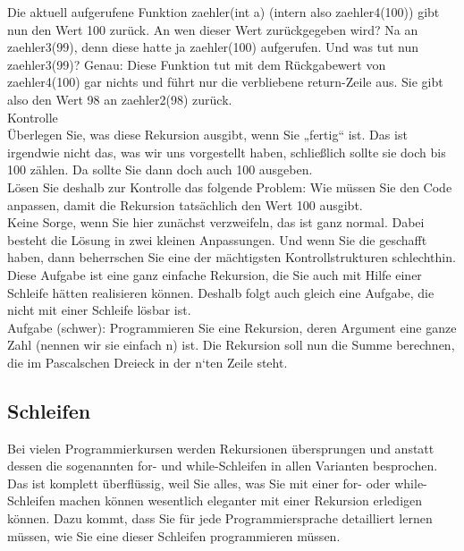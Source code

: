 Die aktuell aufgerufene Funktion zaehler(int a) (intern also zaehler4(100)) gibt nun den Wert 100 zurück. An wen dieser Wert zurückgegeben wird? Na an zaehler3(99), denn diese hatte ja zaehler(100) aufgerufen. Und was tut nun zaehler3(99)? Genau: Diese Funktion tut mit dem Rückgabewert von zaehler4(100) gar nichts und führt nur die verbliebene return-Zeile aus. Sie gibt also den Wert 98 an zaehler2(98) zurück.\\

Kontrolle\\

Überlegen Sie, was diese Rekursion ausgibt, wenn Sie „fertig“ ist. Das ist irgendwie nicht das, was wir uns vorgestellt haben, schließlich sollte sie doch bis 100 zählen. Da sollte Sie dann doch auch 100 ausgeben. \\

Lösen Sie deshalb zur Kontrolle das folgende Problem: Wie müssen Sie den Code anpassen, damit die Rekursion tatsächlich den Wert 100 ausgibt. \\

Keine Sorge, wenn Sie hier zunächst verzweifeln, das ist ganz normal. Dabei besteht die Lösung in zwei kleinen Anpassungen. Und wenn Sie die geschafft haben, dann beherrschen Sie eine der mächtigsten Kontrollstrukturen schlechthin.\\

Diese Aufgabe ist eine ganz einfache Rekursion, die Sie auch mit Hilfe einer Schleife hätten realisieren können. Deshalb folgt auch gleich eine Aufgabe, die nicht mit einer Schleife lösbar ist.\\

Aufgabe (schwer): Programmieren Sie eine Rekursion, deren Argument eine ganze Zahl (nennen wir sie einfach n) ist. Die Rekursion soll nun die Summe berechnen, die im Pascalschen Dreieck in der n‘ten Zeile steht.

\subsection{Schleifen}

Bei vielen Programmierkursen werden Rekursionen übersprungen und anstatt dessen die sogenannten for- und while-Schleifen in allen Varianten besprochen. Das ist komplett überflüssig, weil Sie alles, was Sie mit einer for- oder while-Schleifen machen können wesentlich eleganter mit einer Rekursion erledigen können. Dazu kommt, dass Sie für jede Programmiersprache detailliert lernen müssen, wie Sie eine dieser Schleifen programmieren müssen.\\

